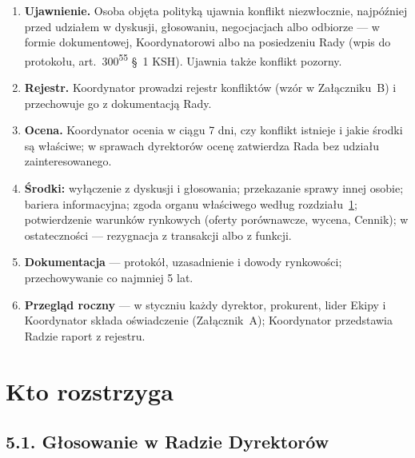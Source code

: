 \documentclass[11pt,a4paper]{report}
\begin{document}
\begin{enumerate}
  \item \textbf{Ujawnienie.} Osoba objęta polityką ujawnia konflikt niezwłocznie, najpóźniej przed udziałem w dyskusji, głosowaniu, negocjacjach albo odbiorze --- w formie dokumentowej, Koordynatorowi albo na posiedzeniu Rady (wpis do protokołu, art.~300\textsuperscript{55} §~1 KSH). Ujawnia także konflikt pozorny.
  \item \textbf{Rejestr.} Koordynator prowadzi rejestr konfliktów (wzór w Załączniku~B) i przechowuje go z dokumentacją Rady.
  \item \textbf{Ocena.} Koordynator ocenia w ciągu 7 dni, czy konflikt istnieje i jakie środki są właściwe; w sprawach dyrektorów ocenę zatwierdza Rada bez udziału zainteresowanego.
  \item \textbf{Środki:} wyłączenie z dyskusji i głosowania; przekazanie sprawy innej osobie; bariera informacyjna; zgoda organu właściwego według rozdziału~\ref{sec:organy}; potwierdzenie warunków rynkowych (oferty porównawcze, wycena, Cennik); w ostateczności --- rezygnacja z transakcji albo z funkcji.
  \item \textbf{Dokumentacja} --- protokół, uzasadnienie i dowody rynkowości; przechowywanie co najmniej 5 lat.
  \item \textbf{Przegląd roczny} --- w styczniu każdy dyrektor, prokurent, lider Ekipy i Koordynator składa oświadczenie (Załącznik~A); Koordynator przedstawia Radzie raport z rejestru.
\end{enumerate}

\section{Kto rozstrzyga}
\label{sec:organy}

\subsection*{5.1. Głosowanie w Radzie Dyrektorów}
\end{document}
